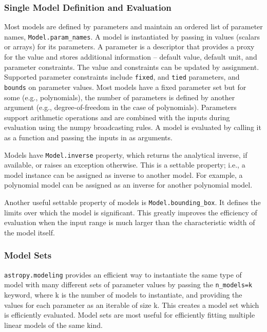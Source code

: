 \documentclass[modern]{aastex61}
\newcommand{\package}[1]{\texttt{#1}\xspace}
\begin{document}
\subsubsection{Single Model Definition and Evaluation}
Most models are defined by parameters and maintain an ordered list of parameter names, \texttt{Model.param\_names}. A model is instantiated by passing in values (scalars or arrays) for its parameters. A parameter is a descriptor that provides a proxy for the value and stores additional information -- default value, default unit, and parameter constraints. The value and constraints can be updated by assignment. Supported parameter constraints include \texttt{fixed}, and \texttt{tied} parameters, and \texttt{bounds} on parameter values. Most models have a fixed parameter set but for some (e.g., polynomials), the number of parameters is defined by another argument (e.g., degree-of-freedom in the case of polynomials). Parameters support arithmetic operations and are combined with the inputs during evaluation using the numpy broadcasting rules. A model is evaluated by calling it as a function and passing the inputs in as arguments.

Models have \texttt{Model.inverse} property, which returns the analytical inverse, if available, or raises an exception otherwise. This is a settable property; i.e., a model instance can be assigned as inverse to another model. For example, a polynomial model can be assigned as an inverse for another polynomial model.

Another useful settable property of models is \texttt{Model.bounding\_box}. It defines the limits over which the model is significant. This greatly improves the efficiency of evaluation when the input range is much larger than the characteristic width of the model itself.

\subsubsection{Model Sets}

\package{astropy.modeling} provides an efficient way to instantiate the same type of model with many different sets of parameter values by passing the \texttt{n\_models=k} keyword, where k is the number of models to instantiate, and providing the values for each parameter as an iterable of size k. This creates a model set which is efficiently evaluated. Model sets are most useful for efficiently fitting multiple linear models of the same kind.
\end{document}
